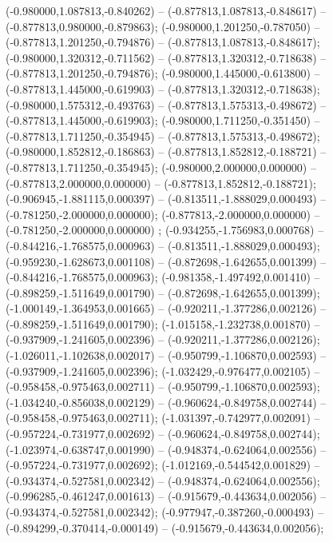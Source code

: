 (-0.980000,1.087813,-0.840262) -- (-0.877813,1.087813,-0.848617) -- (-0.877813,0.980000,-0.879863);
 (-0.980000,1.201250,-0.787050) -- (-0.877813,1.201250,-0.794876) -- (-0.877813,1.087813,-0.848617);
 (-0.980000,1.320312,-0.711562) -- (-0.877813,1.320312,-0.718638) -- (-0.877813,1.201250,-0.794876);
 (-0.980000,1.445000,-0.613800) -- (-0.877813,1.445000,-0.619903) -- (-0.877813,1.320312,-0.718638);
 (-0.980000,1.575312,-0.493763) -- (-0.877813,1.575313,-0.498672) -- (-0.877813,1.445000,-0.619903);
 (-0.980000,1.711250,-0.351450) -- (-0.877813,1.711250,-0.354945) -- (-0.877813,1.575313,-0.498672);
 (-0.980000,1.852812,-0.186863) -- (-0.877813,1.852812,-0.188721) -- (-0.877813,1.711250,-0.354945);
 (-0.980000,2.000000,0.000000) -- (-0.877813,2.000000,0.000000) -- (-0.877813,1.852812,-0.188721);
 (-0.906945,-1.881115,0.000397) -- (-0.813511,-1.888029,0.000493) -- (-0.781250,-2.000000,0.000000);
 (-0.877813,-2.000000,0.000000) -- (-0.781250,-2.000000,0.000000) ;
 (-0.934255,-1.756983,0.000768) -- (-0.844216,-1.768575,0.000963) -- (-0.813511,-1.888029,0.000493);
 (-0.959230,-1.628673,0.001108) -- (-0.872698,-1.642655,0.001399) -- (-0.844216,-1.768575,0.000963);
 (-0.981358,-1.497492,0.001410) -- (-0.898259,-1.511649,0.001790) -- (-0.872698,-1.642655,0.001399);
 (-1.000149,-1.364953,0.001665) -- (-0.920211,-1.377286,0.002126) -- (-0.898259,-1.511649,0.001790);
 (-1.015158,-1.232738,0.001870) -- (-0.937909,-1.241605,0.002396) -- (-0.920211,-1.377286,0.002126);
 (-1.026011,-1.102638,0.002017) -- (-0.950799,-1.106870,0.002593) -- (-0.937909,-1.241605,0.002396);
 (-1.032429,-0.976477,0.002105) -- (-0.958458,-0.975463,0.002711) -- (-0.950799,-1.106870,0.002593);
 (-1.034240,-0.856038,0.002129) -- (-0.960624,-0.849758,0.002744) -- (-0.958458,-0.975463,0.002711);
 (-1.031397,-0.742977,0.002091) -- (-0.957224,-0.731977,0.002692) -- (-0.960624,-0.849758,0.002744);
 (-1.023974,-0.638747,0.001990) -- (-0.948374,-0.624064,0.002556) -- (-0.957224,-0.731977,0.002692);
 (-1.012169,-0.544542,0.001829) -- (-0.934374,-0.527581,0.002342) -- (-0.948374,-0.624064,0.002556);
 (-0.996285,-0.461247,0.001613) -- (-0.915679,-0.443634,0.002056) -- (-0.934374,-0.527581,0.002342);
 (-0.977947,-0.387260,-0.000493) -- (-0.894299,-0.370414,-0.000149) -- (-0.915679,-0.443634,0.002056);
